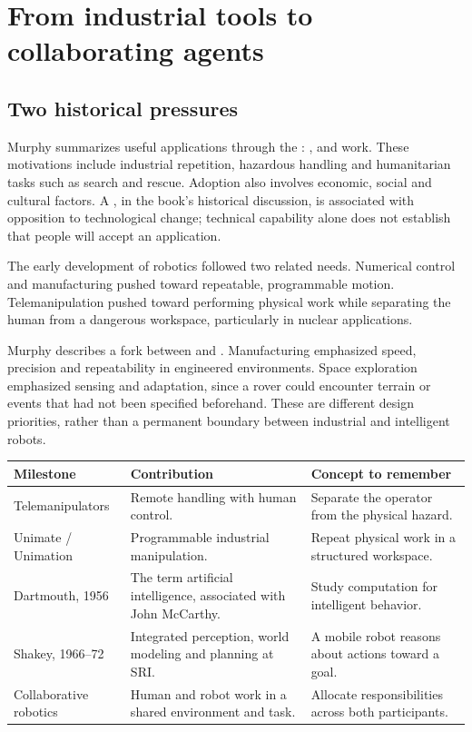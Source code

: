 \section{From industrial tools to collaborating agents}
\subsection{Two historical pressures}
Murphy summarizes useful applications through the : ,  and  work. These motivations include industrial repetition, hazardous handling and humanitarian tasks such as search and rescue. Adoption also involves economic, social and cultural factors. A , in the book's historical discussion, is associated with opposition to technological change; technical capability alone does not establish that people will accept an application.

The early development of robotics followed two related needs. Numerical control and manufacturing pushed toward repeatable, programmable motion. Telemanipulation pushed toward performing physical work while separating the human from a dangerous workspace, particularly in nuclear applications.

Murphy describes a fork between  and . Manufacturing emphasized speed, precision and repeatability in engineered environments. Space exploration emphasized sensing and adaptation, since a rover could encounter terrain or events that had not been specified beforehand. These are different design priorities, rather than a permanent boundary between industrial and intelligent robots.

\par\smallskip\begin{tabularx}{\linewidth}{@{}L{32mm}YY@{}}
\toprule
Milestone & Contribution & Concept to remember \\
\midrule
Telemanipulators & Remote handling with human control. & Separate the operator from the physical hazard. \\
Unimate / Unimation & Programmable industrial manipulation. & Repeat physical work in a structured workspace. \\
Dartmouth, 1956 & The term artificial intelligence, associated with John McCarthy. & Study computation for intelligent behavior. \\
Shakey, 1966--72 & Integrated perception, world modeling and planning at SRI. & A mobile robot reasons about actions toward a goal. \\
Collaborative robotics & Human and robot work in a shared environment and task. & Allocate responsibilities across both participants. \\
\bottomrule
\end{tabularx}\par\smallskip

